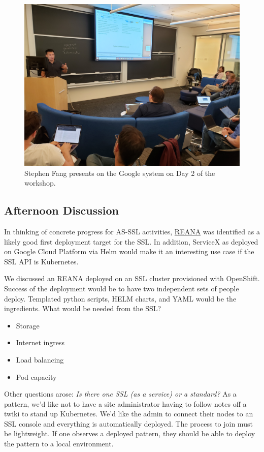 \documentclass[11pt,letterpaper,fleqn]{article}
\begin{document}
\begin{figure}
\centering
  \includegraphics[width=0.89\linewidth]{figures/google.jpg}
  \caption{Stephen Fang presents on the Google system on Day 2 of the workshop.}
  \label{fig:google}
\end{figure}

\subsection{Afternoon Discussion}
\vspace{0.2cm}
In thinking of concrete progress for AS-SSL activities, \href{http://www.reanahub.io/}{REANA} was identified as a likely good first deployment target for the SSL. In addition, ServiceX as deployed on Google Cloud Platform via Helm would make it an interesting use case if the SSL API is Kubernetes.

We discussed an REANA deployed on an SSL cluster provisioned with OpenShift. Success of the deployment would be to have two independent sets of people deploy. Templated python scripts, HELM charts, and YAML would be the ingredients.  What would be needed from the SSL?

\begin{itemize}
  \item Storage
  \item Internet ingress
  \item Load balancing
  \item Pod capacity
\end{itemize}

Other questions arose: {\it Is there one SSL (as a service) or a standard?} As a pattern, we'd like not to have a site administrator having to follow notes off a twiki to stand up Kubernetes. We’d like the admin to connect their nodes to an SSL console and everything is automatically deployed. The process to join must be lightweight. If one observes a deployed pattern, they should be able to deploy the pattern to a local environment.
\end{document}
